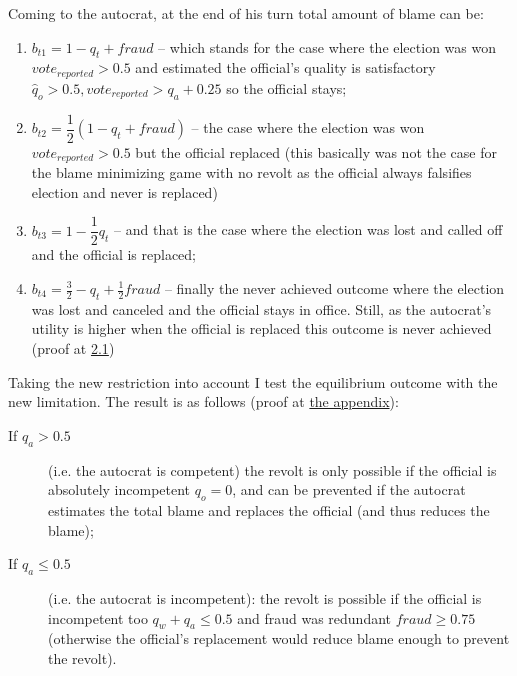 \documentclass[a4paper, 12pt]{article}
\begin{document}
	\noindent Coming to the autocrat, at the end of his turn total amount of blame can be:
	\begin{enumerate}
	
	    \item $b_{t1} = 1 - q_t + fraud$ -- which stands for the case where the election was won $vote_{reported} > 0.5$ and estimated the official's quality is satisfactory $\hat q_o > 0.5, vote_{reported} > q_a + 0.25$ so the official stays;
	    
	    \item $b_{t2} = \dfrac{1}{2}(1-q_t+fraud)$ -- the case where the election was won $vote_{reported} > 0.5$ but the official replaced (this basically was not the case for the blame minimizing game with no revolt as the official always falsifies election and never is replaced)
	    
	    \item $b_{t3} = 1 - \dfrac{1}{2}q_t$ -- and that is the case where the election was lost and called off and the official is replaced;
	    
	    \item $b_{t4}=\frac{3}{2}-q_t+\frac{1}{2}fraud$ -- finally the never achieved outcome where the election was lost and canceled and the official stays in office. Still, as the autocrat's utility is higher when the official is replaced this outcome is never achieved (proof at \hyperlink{fig2_1}{2.1})
	    
	\end{enumerate}
	
	\noindent Taking the new restriction into account I test the equilibrium outcome with the new limitation. The result is as follows (proof at \hyperlink{app2}{the appendix}):
	\begin{description}
	    \item[ If $q_a > 0.5$] (i.e. the autocrat is competent) the revolt is only possible if the official is absolutely incompetent $q_o = 0$, and can be prevented if the autocrat estimates the total blame and replaces the official (and thus reduces the blame);
	    
	    \item[ If $q_a \leq 0.5$] (i.e. the autocrat is incompetent): the revolt is possible if the official is incompetent too $q_w + q_a \leq 0.5$ and fraud was redundant $fraud \geq 0.75$ (otherwise the official's replacement would reduce blame enough to prevent the revolt).
	    
	\end{description}
\end{document}
